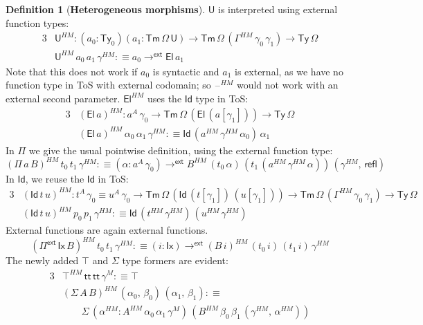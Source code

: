 \documentclass[12pt,a4paper,twoside,openany]{book}
\theoremstyle{remark}
\theoremstyle{definition}
\newtheorem{mydefinition}{Definition}
\theoremstyle{theorem}
\newcommand{\ms}[1]{\mathsf{#1}}
\newcommand{\refl}{\mathsf{refl}}
\newcommand{\Tm}{\mathsf{Tm}}
\newcommand{\Ty}{\mathsf{Ty}}
\newcommand{\U}{\mathsf{U}}
\newcommand{\El}{\mathsf{El}}
\newcommand{\Id}{\mathsf{Id}}
\renewcommand{\tt}{\mathsf{tt}}
\newcommand{\blank}{\mathord{\hspace{1pt}\text{--}\hspace{1pt}}}
\newcommand{\Pie}{\Pi^{\mathsf{ext}}}
\newcommand{\toe}{\to^{\ms{ext}}}
\newcommand{\defn}{:\equiv}
\begin{document}
\begin{mydefinition}[\textbf{Heterogeneous morphisms}]
\noindent $\U$ is interpreted using external function types:
\begin{alignat*}{3}
  & \U^{HM} : (a_0 : \Ty_0)(a_1 : \Tm\,\Omega\,\U) \to \Tm\,\Omega\,(\Gamma^{HM}\,\gamma_0\,\gamma_1)
  \to \Ty\,\Omega\\
  & \U^{HM}\,a_0\,a_1\,\gamma^{HM} \defn a_0 \toe \El\,a_1
\end{alignat*}
Note that this does not work if $a_0$ is syntactic and $a_1$ is external, as we
have no function type in ToS with external codomain; so $\blank^{HM}$ would not
work with an external second parameter. $\El^{HM}$ uses the $\Id$ type in ToS:
\begin{alignat*}{3}
  & (\El\,a)^{HM} : a^A\,\gamma_0 \to \Tm\,\Omega\,(\El\,(a[\gamma_1])) \to \Ty\,\Omega\\
  & (\El\,a)^{HM}\,\alpha_0\,\alpha_1\,\gamma^{HM} \defn \Id\,(a^{HM}\,\gamma^{HM}\,\alpha_0)\,\alpha_1
\end{alignat*}
In $\Pi$ we give the usual pointwise definition, using the external function type:
\[
  (\Pi\,a\,B)^{HM}\,t_0\,t_1\,\gamma^{HM} \defn (\alpha : a^A\,\gamma_0) \toe B^{HM}\,(t_0\,\alpha)\,(t_1\,(a^{HM}\,\gamma^{HM}\,\alpha))\,(\gamma^{HM},\,\refl)
\]
In $\Id$, we reuse the $\Id$ in ToS:
\begin{alignat*}{3}
  &(\Id\,t\,u)^{HM} : t^A\,\gamma_0 \equiv u^A\,\gamma_0 \to \Tm\,\Omega\,(\Id\,(t[\gamma_1])\,(u[\gamma_1]))
   \to \Tm\,\Omega\,(\Gamma^{HM}\,\gamma_0\,\gamma_1) \to \Ty\,\Omega\\
  &(\Id\,t\,u)^{HM}\,p_0\,p_1\,\gamma^{HM} \defn  \Id\,(t^{HM}\,\gamma^{HM})\,(u^{HM}\,\gamma^{HM})
\end{alignat*}
External functions are again external functions.
\[
  (\Pie\,\ms{Ix}\,B)^{HM}\,t_0\,t_1\,\gamma^{HM} \defn (i : \ms{Ix}) \toe (B\,i)^{HM}\,(t_0\,i)\,(t_1\,i)\,\gamma^{HM}
\]
The newly added $\top$ and $\Sigma$ type formers are evident:
\begin{alignat*}{3}
  &\top^{HM}\,\tt\,\tt\,\gamma^M \defn \top\\
  &(\Sigma\,A\,B)^{HM}\,(\alpha_0,\,\beta_0)\,(\alpha_1,\,\beta_1) \defn\\
  &\hspace{2em}\Sigma\,(\alpha^{HM} : A^{HM}\,\alpha_0\,\alpha_1\,\gamma^M)\,
          (B^{HM}\,\beta_0\,\beta_1\,(\gamma^{HM},\,\alpha^{HM}))
\end{alignat*}
\end{mydefinition}
\end{document}
